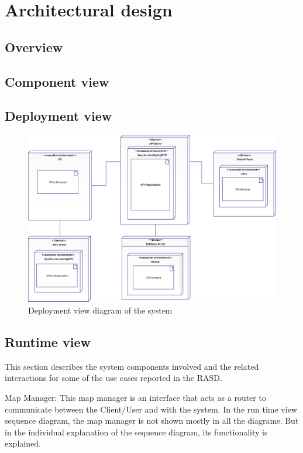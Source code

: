 \chapter{Architectural design}

\section{Overview}

\section{Component view}

\section{Deployment view}
\begin{figure}[h]
	\centering
	\includegraphics[width=\linewidth,keepaspectratio]{figures/deployment_view.eps}
	\caption{Deployment view diagram of the system}
	\label{fig:deployment_view}
\end{figure}

\section{Runtime view}
This section describes the system components involved and the related interactions for some of the use cases reported in the RASD.

Map Manager:
This map manager is an interface that acts as a router to communicate between the Client/User and with the system. In the run time view sequence diagram,
the map manager is not shown mostly in all the diagrams. But in the individual explanation of the sequence diagram, its functionality is explained.

